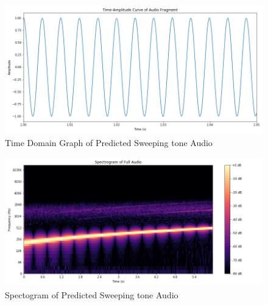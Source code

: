 \documentclass{ioereport}
\begin{document}
    \begin{figure}[H]
        \centering
        \includegraphics[width=\linewidth]{assets/audio_results/Predsweeping_tone200-500hztime.png}
        \caption{Time Domain Graph of Predicted Sweeping tone Audio}
        \label{fig:pred-sweeping-time}
    \end{figure}
    \begin{figure}[H]
        \centering
        \includegraphics[width=\linewidth]{assets/audio_results/Predsweeping_tone200-500hzspec.png}
        \caption{Spectogram of Predicted Sweeping tone Audio}
        \label{fig:pred-sweeping-spec}
    \end{figure}
\end{document}
